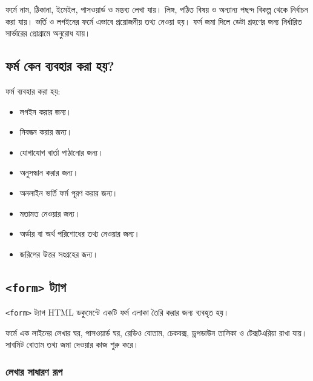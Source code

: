 ফর্মে নাম, ঠিকানা, ইমেইল, পাসওয়ার্ড ও মন্তব্য লেখা যায়। লিঙ্গ, পঠিত বিষয় ও অন্যান্য পছন্দ বিকল্প থেকে নির্বাচন করা যায়। ভর্তি ও লগইনের ফর্মে এভাবে প্রয়োজনীয় তথ্য নেওয়া হয়। ফর্ম জমা দিলে ডেটা গ্রহণের জন্য নির্ধারিত সার্ভারের প্রোগ্রামে অনুরোধ যায়।



\subsection{ফর্ম কেন ব্যবহার করা হয়?}

ফর্ম ব্যবহার করা হয়:
\par\noindent
\begin{minipage}[t]{.48\linewidth}\vspace{0pt}
\begin{itemize}
\item লগইন করার জন্য।
\item নিবন্ধন করার জন্য।
\item যোগাযোগ বার্তা পাঠানোর জন্য।
\item অনুসন্ধান করার জন্য।
\end{itemize}
\end{minipage}\hfill
\begin{minipage}[t]{.48\linewidth}\vspace{0pt}
\begin{itemize}
\item অনলাইন ভর্তি ফর্ম পূরণ করার জন্য।
\item মতামত নেওয়ার জন্য।
\item অর্ডার বা অর্থ পরিশোধের তথ্য নেওয়ার জন্য।
\item জরিপের উত্তর সংগ্রহের জন্য।
\end{itemize}
\end{minipage}\par


\subsection{\texttt{<form>} ট্যাগ}

\begin{definitionbox}{}
\texttt{<form>} ট্যাগ HTML ডকুমেন্টে একটি ফর্ম এলাকা তৈরি করার জন্য ব্যবহৃত হয়।
\end{definitionbox}

ফর্মে এক লাইনের লেখার ঘর, পাসওয়ার্ড ঘর, রেডিও বোতাম, চেকবক্স, ড্রপডাউন তালিকা ও টেক্সটএরিয়া রাখা যায়। সাবমিট বোতাম তথ্য জমা দেওয়ার কাজ শুরু করে।

\subsubsection{লেখার সাধারণ রূপ}

